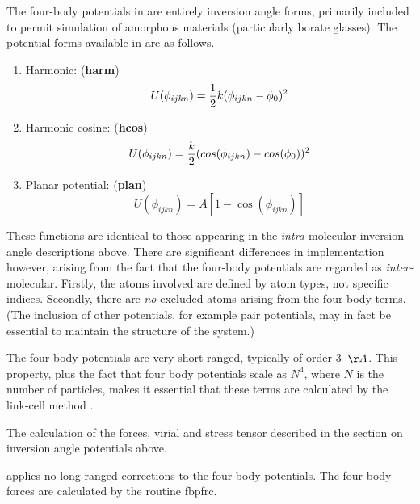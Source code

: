 The four-body potentials in \D{} are entirely inversion angle forms,
primarily included to permit simulation of amorphous materials
(particularly borate glasses). The potential forms available in \D{} are
as follows.
\begin{enumerate}
\item Harmonic: ({\bf harm})
\begin{equation}
U(\phi_{ijkn})= {1\over 2} k (\phi_{ijkn} - \phi_0)^2 
\end{equation}
\item Harmonic cosine: ({\bf hcos})
\begin{equation}
U(\phi_{ijkn})={k\over 2}(cos(\phi_{ijkn}) -cos(\phi_{0}))^{2}
\end{equation}
\item Planar potential: ({\bf plan})
\begin{equation}
U(\phi_{ijkn})= A  [ 1 - \cos (\phi_{ijkn})] 
\end{equation}
\end{enumerate}
These functions are identical to those appearing in the {\em
intra-}molecular inversion angle descriptions above. There are
significant differences in implementation however, arising from the
fact that the four-body potentials are regarded as {\em
inter-}molecular.  Firstly, the atoms involved are defined by atom
types, not specific indices.  Secondly, there are {\em no} excluded
atoms arising from the four-body terms. (The inclusion of other
potentials, for example pair potentials, may in fact be essential to
maintain the structure of the system.)

The four body potentials are very short
ranged, typically of order 3~$\AA$. This property, plus the fact that
four body potentials scale as $N^{4}$,
where $N$ is the number of particles, makes it essential that these
terms are calculated by the link-cell method \cite{eastwood-80a}.

The calculation of the forces, virial and stress tensor
described in the section on inversion angle potentials above.

\D{} applies no long ranged corrections to the four body potentials.
The four-body forces are calculated by the routine {\sc fbpfrc}.

